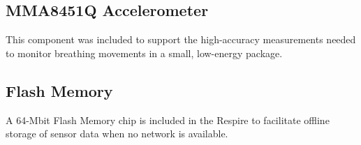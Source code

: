 \subsection{MMA8451Q Accelerometer}
This component was included to support the high-accuracy measurements needed to monitor
breathing movements in a small, low-energy package.

\subsection{Flash Memory}
A 64-Mbit Flash Memory chip is included in the Respire to facilitate offline storage of sensor data
when no network is available.



